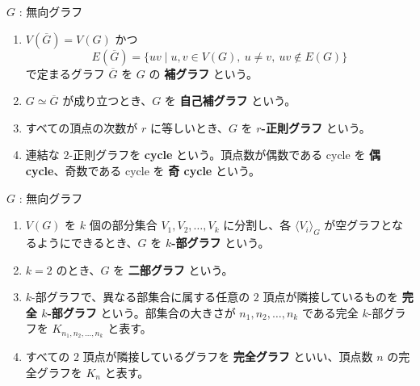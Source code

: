 \documentclass[article,paper=a4paper]{jlreq}
\begin{document}
\begin{dfn}
  \quad $G$ : 無向グラフ
  \begin{enumerate}[label=(\arabic*)\, ]
    \item $V(\overline{G})=V(G)$ かつ
    \[
      E(\overline{G})
      =
      \{uv \mid u,v \in V(G),\ u \neq v,\ uv \notin E(G)\}
    \]
    で定まるグラフ $\overline{G}$ を $G$ の \textbf{補グラフ} という。
    \item $G \simeq \overline{G}$ が成り立つとき、$G$ を \textbf{自己補グラフ} という。
    \item すべての頂点の次数が $r$ に等しいとき、$G$ を \textbf{$r$-正則グラフ} という。
    \item 連結な $2$-正則グラフを \textbf{cycle} という。頂点数が偶数である cycle を \textbf{偶 cycle}、奇数である cycle を \textbf{奇 cycle} という。
  \end{enumerate}
\end{dfn}

\begin{dfn}
  \quad $G$ : 無向グラフ
  \begin{enumerate}[label=(\arabic*)\, ]
    \item $V(G)$ を $k$ 個の部分集合 $V_1,V_2,\ldots,V_k$ に分割し、各 $\langle V_i\rangle_G$ が空グラフとなるようにできるとき、$G$ を \textbf{$k$-部グラフ} という。
    \item $k=2$ のとき、$G$ を \textbf{二部グラフ} という。
    \item $k$-部グラフで、異なる部集合に属する任意の $2$ 頂点が隣接しているものを \textbf{完全 $k$-部グラフ} という。部集合の大きさが $n_1,n_2,\ldots,n_k$ である完全 $k$-部グラフを $K_{n_1,n_2,\ldots,n_k}$ と表す。
    \item すべての $2$ 頂点が隣接しているグラフを \textbf{完全グラフ} といい、頂点数 $n$ の完全グラフを $K_n$ と表す。
  \end{enumerate}
\end{dfn}
\end{document}

